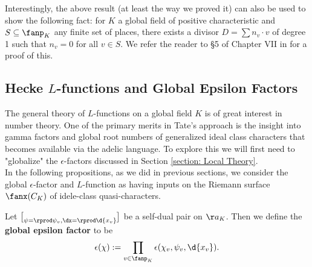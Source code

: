 \documentclass[11pt, x11names, openany]{book}
\begin{document}
\begin{remark}
Interestingly, the above result (at least the way we proved it) can also be used to show the following fact: for $K$ a global field of positive characteristic and $S \subseteq \fanp_K$ any finite set of places, there exists a divisor $D = \sum n_v \cdot v$ of degree 1 such that $n_v = 0$ for all $v \in S$. We refer the reader to \S 5 of Chapter VII in \cite{weil1974basic} for a proof of this.
\end{remark}


\subsection{Hecke $L$-functions and Global Epsilon Factors}
\label{subsection: L-function and epsilon factor}
The general theory of $L$-functions on a global field $K$ is of great interest in number theory. One of the primary merits in Tate's approach is the insight into gamma factors and global root numbers of generalized ideal class characters that becomes available via the adelic language. To explore this we will first need to "globalize" the $\epsilon$-factors discussed in Section \ref{section: Local Theory}.\\

In the following propositions, as we did in previous sections, we consider the global $\epsilon$-factor and $L$-function as having inputs on the Riemann surface $\fanx(C_K)$ of idele-class quasi-characters.

\begin{defn}
\label{def: global epsilon factor}
Let $\brack{\psi = \rprod \psi_v, \dx = \rprod \d{x_v}}$ be a self-dual pair on $\aa_K$. Then we define the \textbf{global epsilon factor} to be
\begin{equation*}
    \epsilon(\chi) := \prod_{v \in \fanp_K} \epsilon(\chi_v, \psi_v, \d{x_v}).
\end{equation*}
\end{defn}
\end{document}
